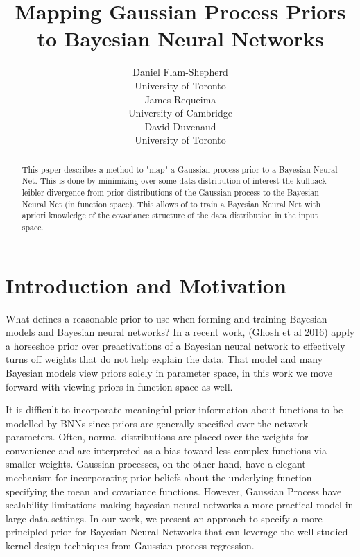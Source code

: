 \documentclass{article}
\title{Mapping Gaussian Process Priors
\\ to Bayesian Neural Networks}
\author{
  Daniel Flam-Shepherd \\
  University of Toronto \\
  \And
  James Requeima  \\
  University of Cambridge \\
  \AND
  David Duvenaud \\
  University of Toronto \\
}
\begin{document}

\maketitle


\begin{abstract}
This paper describes a method to "map" a Gaussian process prior to a Bayesian Neural Net.
This is done by minimizing over some data distribution of interest the kullback leibler
divergence from prior distributions of the Gaussian process to the Bayesian Neural Net
(in function space). This allows of to train a Bayesian Neural Net with apriori knowledge
of the covariance structure of the data distribution in the input space. 
\end{abstract}

\section{Introduction and Motivation}

What defines a reasonable prior to use when forming and training Bayesian models 
and Bayesian neural networks? In a recent work, (Ghosh et al 2016) 
apply a horseshoe prior over preactivations of a Bayesian neural network to 
effectively turns off weights that do not help explain the data. That model and 
many Bayesian models view priors solely in parameter space, in this work we move 
forward with viewing priors in function space as well. 

It is difficult to incorporate meaningful prior information about functions to be modelled by BNNs since priors are generally specified over the network parameters. Often, normal distributions are placed over the weights for convenience and are interpreted as a bias toward less complex functions via smaller weights. Gaussian processes, on the other hand, have a elegant mechanism for incorporating prior beliefs about the underlying function - specifying the mean and covariance functions. However, Gaussian Process have scalability limitations making bayesian neural networks a more practical model in large data settings. In our work, we present an approach to specify a more principled prior for Bayesian Neural Networks that can leverage the well studied kernel design techniques from Gaussian process regression.
\end{document}
